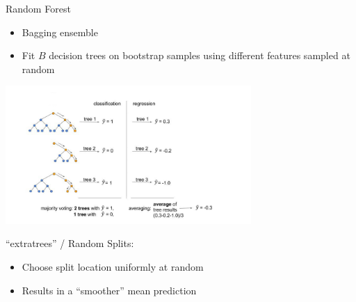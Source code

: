 \documentclass[11pt,compress,t,notes=noshow, xcolor=table]{beamer}
\begin{document}
\begin{frame}{Random Forest}

\begin{itemize}
    \item Bagging ensemble
    \item Fit $B$ decision trees on bootstrap samples using different features sampled at random
\end{itemize}

\begin{center}
  \includegraphics[width = 0.7\textwidth]{slides/010-bayesian-optimization/figure_man/random_forests.jpg}
\end{center}

\enquote{extratrees} / Random Splits:\\
\begin{itemize}
  \item Choose split location uniformly at random
  \item Results in a \enquote{smoother} mean prediction
\end{itemize}

\end{frame}
\end{document}
